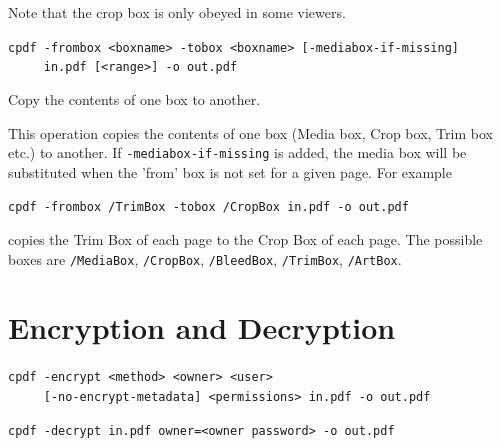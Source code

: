 \documentclass[a4paper,makeidx]{memoir}
\begin{document}
\noindent Note that the crop box is only obeyed in some viewers. 

  \begin{framed}
  \small\noindent\verb!cpdf -frombox <boxname> -tobox <boxname> [-mediabox-if-missing]! \\
  \noindent\verb!     in.pdf [<range>] -o out.pdf!

  \vspace{2.5mm}
  \noindent Copy the contents of one box to another.

  \end{framed}
  \noindent This operation copies the contents of one box (Media box, Crop box, Trim box etc.) to another. If \texttt{-mediabox-if-missing} is added, the media box will be substituted when the 'from' box is not set for a given page. For example

  \begin{framed}
    \small\verb!cpdf -frombox /TrimBox -tobox /CropBox in.pdf -o out.pdf!
  \end{framed}
  \noindent copies the Trim Box of each page to the Crop Box of each page. The possible boxes are \texttt{/MediaBox}, \texttt{/CropBox}, \texttt{/BleedBox}, \texttt{/TrimBox}, \texttt{/ArtBox}.

\chapter{Encryption and Decryption}
  \begin{framed}
    \small\noindent\verb!cpdf -encrypt <method> <owner> <user>!\\
    \noindent\verb!     [-no-encrypt-metadata] <permissions> in.pdf -o out.pdf!

    \vspace{1.5mm}
    \noindent\verb!cpdf -decrypt in.pdf owner=<owner password> -o out.pdf!
  \end{framed}
  \label{crypt}
\end{document}
